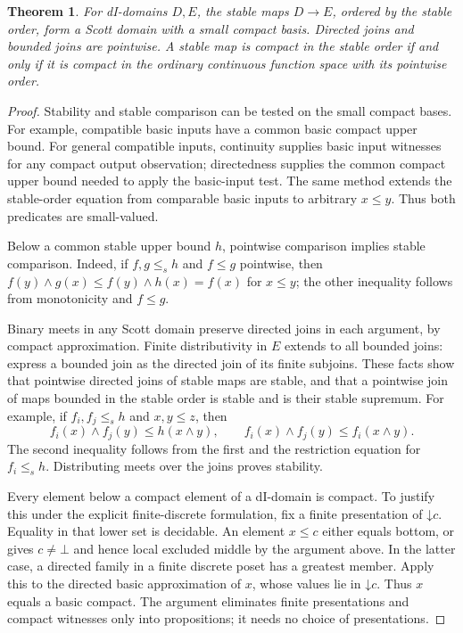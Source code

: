 \documentclass[11pt]{article}
\newtheorem{theorem}{Theorem}[section]
\begin{document}
\begin{theorem}\label{thm:stable}
For dI-domains $D,E$, the stable maps $D\to E$, ordered by the stable
order, form a Scott domain with a small compact basis. Directed joins
and bounded joins are pointwise. A stable map is compact in the stable
order if and only if it is compact in the ordinary continuous function
space with its pointwise order.
\end{theorem}
\begin{proof}
Stability and stable comparison can be tested on the small compact
bases. For example, compatible basic inputs have a common basic compact
upper bound. For general compatible inputs, continuity supplies basic
input witnesses for any compact output observation; directedness supplies
the common compact upper bound needed to apply the basic-input test.
The same method extends the stable-order equation from comparable basic
inputs to arbitrary $x\le y$. Thus both predicates are small-valued.

Below a common stable upper bound $h$, pointwise comparison implies
stable comparison. Indeed, if $f,g\le_s h$ and $f\le g$ pointwise, then
$f(y)\wedge g(x)\le f(y)\wedge h(x)=f(x)$ for $x\le y$; the other
inequality follows from monotonicity and $f\le g$.

Binary meets in any Scott domain preserve directed joins in each
argument, by compact approximation. Finite distributivity in $E$ extends
to all bounded joins: express a bounded join as the directed join of
its finite subjoins. These facts show that pointwise directed joins of
stable maps are stable, and that a pointwise join of maps bounded in
the stable order is stable and is their stable supremum. For example,
if $f_i,f_j\le_s h$ and $x,y\le z$, then
\[
 f_i(x)\wedge f_j(y)\le h(x\wedge y),\qquad
 f_i(x)\wedge f_j(y)\le f_i(x\wedge y).
\]
The second inequality follows from the first and the restriction equation
for $f_i\le_s h$. Distributing meets over the joins proves stability.

Every element below a compact element of a dI-domain is compact. To
justify this under the explicit finite-discrete formulation, fix a
finite presentation of $\mathord\downarrow c$. Equality in that lower
set is decidable. An element $x\le c$ either equals bottom, or gives
$c\ne\bot$ and hence local excluded middle by the argument above.
In the latter case, a directed family in a finite discrete poset has
a greatest member. Apply this to the directed basic approximation of
$x$, whose values lie in $\mathord\downarrow c$. Thus $x$ equals a
basic compact. The argument eliminates finite presentations and compact
witnesses only into propositions; it needs no choice of presentations.


\end{proof}
\end{document}
